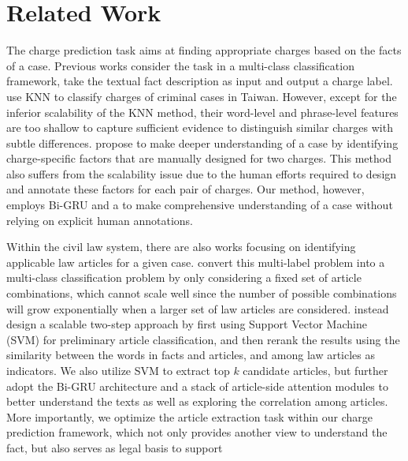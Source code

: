 \section{Related Work}
\label{sec_related_work}
The charge prediction task aims at finding appropriate charges based on the facts of a case. Previous works consider the task in a multi-class classification framework, take the textual fact description as input and output a charge label. 
\cite{LIU2004case,liu2006exploring} use KNN to classify charges of criminal cases in Taiwan. However, except for the inferior scalability of the KNN method, their word-level and phrase-level features are too shallow to capture  sufficient evidence to distinguish similar charges with subtle differences. 
\cite{lin2012exploiting} propose to make deeper understanding of a case by identifying charge-specific factors that are manually designed for two charges. This method also suffers from the scalability issue due to the human efforts required to design and annotate these factors for each pair of charges. Our method, however, employs Bi-GRU and a  to make comprehensive understanding of a case without relying on explicit human annotations. 

Within the civil law system,
there are also works focusing on identifying applicable law articles for a given case. 
\cite{liu2005classifying,liu2006exploring} convert this multi-label problem into a multi-class classification problem by only considering a fixed set of article combinations, which cannot scale well since the number of possible combinations will grow exponentially when a larger set of law articles are considered.
\cite{liu2015predicting} instead design a scalable two-step approach %
by first using Support Vector Machine (SVM) for preliminary article classification, and then 
rerank the results using the similarity between the words in facts and articles, and  among law articles as indicators.
We also utilize SVM to extract top $k$ candidate articles, but further adopt the Bi-GRU architecture and a stack of article-side attention modules to better understand the texts as well as exploring the correlation among articles. 
More importantly, we optimize the article extraction task within our charge prediction framework,  which not only provides another view to understand the fact, but also serves as legal basis to support 

